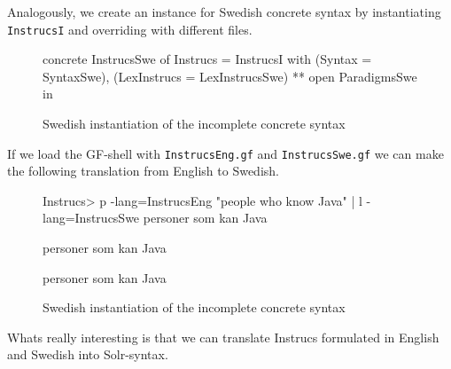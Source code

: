 Analogously, we create an instance for Swedish concrete syntax by instantiating \texttt{InstrucsI} and overriding with different files.

\begin{figure}[H]
\begin{code}
concrete InstrucsSwe of Instrucs = InstrucsI with 
                                             (Syntax = SyntaxSwe), 
                                             (LexInstrucs = LexInstrucsSwe) 
                                             ** open ParadigmsSwe in {}
\end{code}
\caption{Swedish instantiation of the incomplete concrete syntax}
\end{figure}

If we load the GF-shell with \texttt{InstrucsEng.gf} and \texttt{InstrucsSwe.gf} we can make the following translation from English to Swedish.

\begin{figure}[H]
\begin{code}
Instrucs> p -lang=InstrucsEng "people who know Java" | l -lang=InstrucsSwe
personer som kan Java

personer som kan Java

personer som kan Java

\end{code}
\caption{Swedish instantiation of the incomplete concrete syntax}
\end{figure}

 Whats really interesting is that we can translate Instrucs formulated in English and Swedish into Solr-syntax.